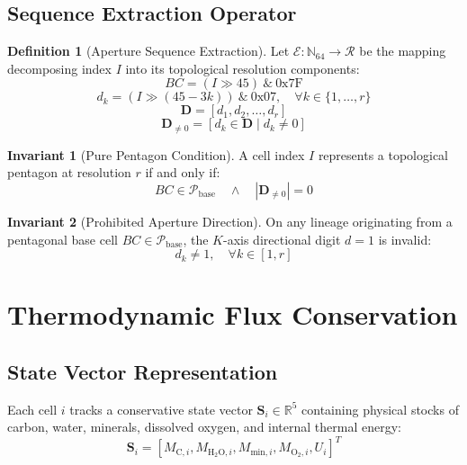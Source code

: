 \documentclass[10pt,twocolumn,a4paper]{article}
\theoremstyle{definition}
\newtheorem{definition}{Definition}
\newtheorem{invariant}{Invariant}
\begin{document}
\subsection{Sequence Extraction Operator}
\begin{definition}[Aperture Sequence Extraction]
Let $\mathcal{E}: \mathbb{N}_{64} \to \mathcal{R}$ be the mapping decomposing index $I$ into its topological resolution components:
\begin{equation}
BC = (I \gg 45) \ \& \ \text{0x7F}
\end{equation}
\begin{equation}
d_k = (I \gg (45 - 3k)) \ \& \ \text{0x07}, \quad \forall k \in \{1, \dots, r\}
\end{equation}
\begin{equation}
\mathbf{D} = [d_1, d_2, \dots, d_r]
\end{equation}
\begin{equation}
\mathbf{D}_{\neq 0} = [d_k \in \mathbf{D} \mid d_k \neq 0]
\end{equation}
\end{definition}

\begin{invariant}[Pure Pentagon Condition]
A cell index $I$ represents a topological pentagon at resolution $r$ if and only if:
\begin{equation}
BC \in \mathcal{P}_{\text{base}} \quad \wedge \quad |\mathbf{D}_{\neq 0}| = 0
\end{equation}
\end{invariant}

\begin{invariant}[Prohibited Aperture Direction]
On any lineage originating from a pentagonal base cell $BC \in \mathcal{P}_{\text{base}}$, the $K$-axis directional digit $d=1$ is invalid:
\begin{equation}
d_k \neq 1, \quad \forall k \in [1, r]
\end{equation}
\end{invariant}

\section{Thermodynamic Flux Conservation}

\subsection{State Vector Representation}
Each cell $i$ tracks a conservative state vector $\mathbf{S}_i \in \mathbb{R}^5$ containing physical stocks of carbon, water, minerals, dissolved oxygen, and internal thermal energy:
\begin{equation}
\mathbf{S}_i = [M_{\text{C}, i}, M_{\text{H}_2\text{O}, i}, M_{\text{min}, i}, M_{\text{O}_2, i}, U_i]^T
\end{equation}
\end{document}
